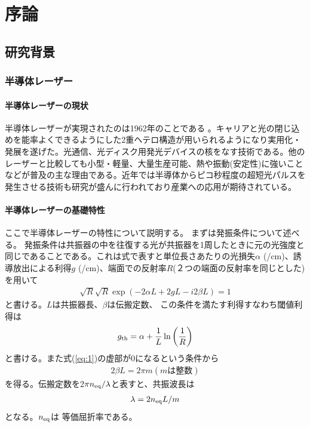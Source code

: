 \chapter{序論}
\section{研究背景}
\subsection{半導体レーザー}
\subsubsection{半導体レーザーの現状}
半導体レーザーが実現されたのは1962年のことである 。キャリアと光の閉じ込めを能率よくできるようにした2重ヘテロ構造が用いられるようになり実用化・発展を遂げた。光通信、光ディスク用発光デバイスの核をなす技術である。他のレーザーと比較しても小型・軽量、大量生産可能、熱や振動(安定性)に強いことなどが普及の主な理由である。近年では半導体からピコ秒程度の超短光パルスを発生させる技術も研究が盛んに行われており産業への応用が期待されている。

\subsubsection{半導体レーザーの基礎特性}
ここで半導体レーザーの特性について説明する。
まずは発振条件について述べる。
発振条件は共振器の中を往復する光が共振器を1周したときに元の光強度と同じであることである。これは式で表すと単位長さあたりの光損失$\alpha$ (/cm)、誘導放出による利得$g$ (/cm)、端面での反射率$R$(２つの端面の反射率を同じとした)を用いて
\begin{eqnarray}
\sqrt{R}\sqrt{R} \exp(-2\alpha L+ 2gL-i2\beta L)=1
\label{eq:1}
\end{eqnarray}
と書ける。$L$は共振器長、$\beta$は伝搬定数、
この条件を満たす利得すなわち閾値利得は
\begin{equation}
g_{\rm{th}}=\alpha+\dfrac{1}{L}\ln\left(\dfrac{1}{R}\right)
\end{equation}
と書ける。また式(\ref{eq:1})の虚部が0になるという条件から
\begin{eqnarray}
2\beta L=2\pi m   (mは整数)
\end{eqnarray}
を得る。伝搬定数を2$\pi n_{\rm{eq}}/\lambda$と表すと、共振波長は
\begin{eqnarray}
\lambda =2n_{\rm{eq}}L/m
\end{eqnarray}
となる。$n_{\rm{eq}}$は
等価屈折率である。

